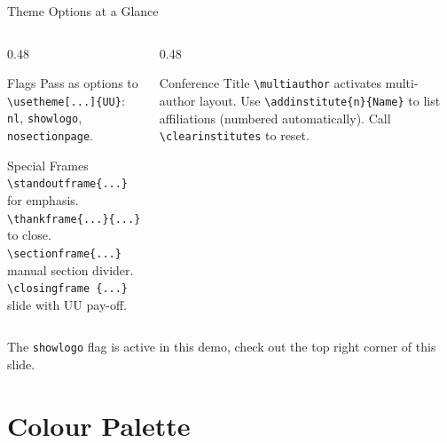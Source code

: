 \documentclass[aspectratio=169,10pt]{beamer}
\begin{document}
\begin{frame}{Theme Options at a Glance}
  \begin{columns}[T]
    \begin{column}{0.48\textwidth}
      \begin{block}{Flags} \footnotesize
        Pass as options to \texttt{\textbackslash usetheme[...]}\texttt{\{UU\}}:
        \texttt{nl}, \texttt{showlogo}, \texttt{nosectionpage}.
      \end{block}
      \vskip 6pt
      \begin{block}{Special Frames} \footnotesize
        \texttt{\textbackslash standoutframe\{...\}} for emphasis.\\
        \texttt{\textbackslash thankframe\{...\}\{...\}} to close.\\
        \texttt{\textbackslash sectionframe\{...\}} manual section divider. \\
        \texttt{\textbackslash closingframe \{...\}} slide with UU pay-off.
      \end{block}
    \end{column}
    \begin{column}{0.48\textwidth} \footnotesize
      \begin{block}{Conference Title}
        \texttt{\textbackslash multiauthor} activates multi-author layout.
        Use \texttt{\textbackslash addinstitute\{n\}\{Name\}} to list affiliations
        (numbered automatically). Call \texttt{\textbackslash clearinstitutes} to reset.
      \end{block}
    \end{column}
  \end{columns}

  \vskip 10pt
  The \texttt{showlogo} flag is active in this demo, check out the top right corner of this slide.
\end{frame}


\section{Colour Palette}
\end{document}
